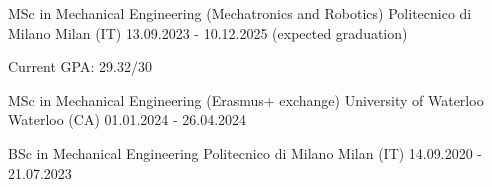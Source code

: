 
\begin{cventries}

  \cventry
  {MSc in Mechanical Engineering (Mechatronics and Robotics)}
  {Politecnico di Milano}
  {Milan (IT)}
  {13.09.2023 - 10.12.2025 (expected graduation)}
  {
    \begin{cvitems}
      \item {Current GPA: 29.32/30}
    \end{cvitems}
  }

  \cventry
  {MSc in Mechanical Engineering (Erasmus+ exchange)}
  {University of Waterloo}
  {Waterloo (CA)}
  {01.01.2024 - 26.04.2024}
  {}
  \vspace{-4mm}

  \cventry
  {BSc in Mechanical Engineering}
  {Politecnico di Milano}
  {Milan (IT)}
  {14.09.2020 - 21.07.2023}
  {}

\end{cventries}
